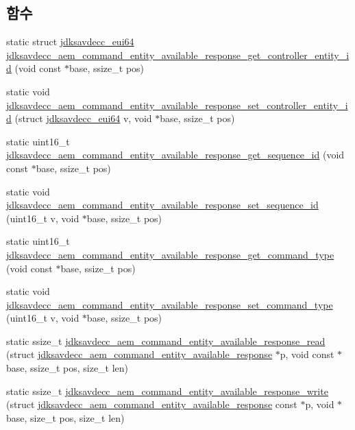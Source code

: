 \subsection*{함수}
\begin{DoxyCompactItemize}
\item 
static struct \hyperlink{structjdksavdecc__eui64}{jdksavdecc\+\_\+eui64} \hyperlink{group__command__entity__available__response_gab0e92446801d3833e830ba42dade1f7f}{jdksavdecc\+\_\+aem\+\_\+command\+\_\+entity\+\_\+available\+\_\+response\+\_\+get\+\_\+controller\+\_\+entity\+\_\+id} (void const $\ast$base, ssize\+\_\+t pos)
\item 
static void \hyperlink{group__command__entity__available__response_ga26fb2872dcfbb6cc22367c9c426309b6}{jdksavdecc\+\_\+aem\+\_\+command\+\_\+entity\+\_\+available\+\_\+response\+\_\+set\+\_\+controller\+\_\+entity\+\_\+id} (struct \hyperlink{structjdksavdecc__eui64}{jdksavdecc\+\_\+eui64} v, void $\ast$base, ssize\+\_\+t pos)
\item 
static uint16\+\_\+t \hyperlink{group__command__entity__available__response_ga023e8f97c780f3fa3fb840803697c07a}{jdksavdecc\+\_\+aem\+\_\+command\+\_\+entity\+\_\+available\+\_\+response\+\_\+get\+\_\+sequence\+\_\+id} (void const $\ast$base, ssize\+\_\+t pos)
\item 
static void \hyperlink{group__command__entity__available__response_ga010b79d23aaf40b8d88a9bc419681a0e}{jdksavdecc\+\_\+aem\+\_\+command\+\_\+entity\+\_\+available\+\_\+response\+\_\+set\+\_\+sequence\+\_\+id} (uint16\+\_\+t v, void $\ast$base, ssize\+\_\+t pos)
\item 
static uint16\+\_\+t \hyperlink{group__command__entity__available__response_gae5e9a1deec74108313aef5d18134c897}{jdksavdecc\+\_\+aem\+\_\+command\+\_\+entity\+\_\+available\+\_\+response\+\_\+get\+\_\+command\+\_\+type} (void const $\ast$base, ssize\+\_\+t pos)
\item 
static void \hyperlink{group__command__entity__available__response_ga37d6a23da1c101088aa797ce11f5862d}{jdksavdecc\+\_\+aem\+\_\+command\+\_\+entity\+\_\+available\+\_\+response\+\_\+set\+\_\+command\+\_\+type} (uint16\+\_\+t v, void $\ast$base, ssize\+\_\+t pos)
\item 
static ssize\+\_\+t \hyperlink{group__command__entity__available__response_gabde2ccc31e53407a8978e67880226568}{jdksavdecc\+\_\+aem\+\_\+command\+\_\+entity\+\_\+available\+\_\+response\+\_\+read} (struct \hyperlink{structjdksavdecc__aem__command__entity__available__response}{jdksavdecc\+\_\+aem\+\_\+command\+\_\+entity\+\_\+available\+\_\+response} $\ast$p, void const $\ast$base, ssize\+\_\+t pos, size\+\_\+t len)
\item 
static ssize\+\_\+t \hyperlink{group__command__entity__available__response_ga922b8b3665d1f82eb9af0fbbd1f9ad99}{jdksavdecc\+\_\+aem\+\_\+command\+\_\+entity\+\_\+available\+\_\+response\+\_\+write} (struct \hyperlink{structjdksavdecc__aem__command__entity__available__response}{jdksavdecc\+\_\+aem\+\_\+command\+\_\+entity\+\_\+available\+\_\+response} const $\ast$p, void $\ast$base, size\+\_\+t pos, size\+\_\+t len)
\end{DoxyCompactItemize}


